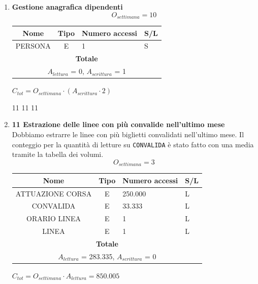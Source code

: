 \documentclass[12pt,a4paper]{report}
\begin{document}
\begin{enumerate}[label=\textbf{\arabic*)}]
    \item \textbf{Gestione anagrafica dipendenti} \\
    \[ {O_{settimana} = 10} \]
    \begin{table}[H]
    \centering
    \begin{tabular}{|c|c|l|l|}
    \hline
    \textbf{Nome} & \textbf{Tipo} & \textbf{Numero accessi} & \textbf{S/L} \\
    \hline
    PERSONA & E & 1 & S \\
    \hline
    \multicolumn{4}{c}{\textbf{Totale}} \\    
    \multicolumn{4}{c}{${A_{lettura}}$ = 0, ${A_{scrittura}}$ = 1} \\
    \hline
    \end{tabular}
    \end{table}
    \begin{center}
    ${C_{tot} = {O_{settimana}}\cdot({A_{scrittura}}\cdot 2)}$
    \end{center}

11 11 11
\item \textbf{11 Estrazione delle linee con più convalide nell'ultimo mese} \\
    Dobbiamo estrarre le linee con più biglietti convalidati nell'ultimo mese. Il conteggio per la quantità di letture su \texttt{CONVALIDA} è stato fatto con una media tramite la tabella dei volumi. 
    \[ {O_{settimana} = 3} \]
    \begin{table}[H]
    \centering
    \begin{tabular}{|c|c|l|l|}
    \hline
    \textbf{Nome} & \textbf{Tipo} & \textbf{Numero accessi} & \textbf{S/L} \\
    \hline
    ATTUAZIONE CORSA & E & 250.000 & L \\
    \hline
    CONVALIDA & E & 33.333 & L \\ 
    \hline
    ORARIO LINEA & E & 1 & L \\ 
    \hline
    LINEA & E & 1 & L \\ 
    \hline
    \multicolumn{4}{c}{\textbf{Totale}} \\    
    \multicolumn{4}{c}{${A_{lettura}}$ = 283.335, ${A_{scrittura}}$ = 0} \\
    \hline
    \end{tabular}
    \end{table}
    \begin{center}
    ${C_{tot} = {O_{settimana}}\cdot {A_{lettura}} = 850.005}$
    \end{center}


\end{enumerate}
\end{document}

